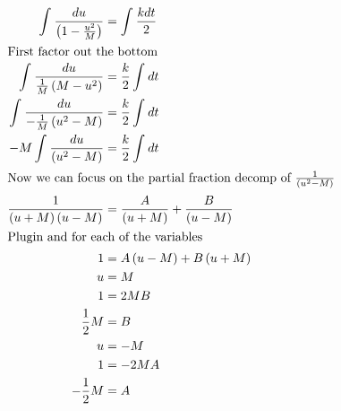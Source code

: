 \documentclass[12pt]{article}
\begin{document}
\begin{align}
  \int_{ }^{ }\frac{du}{\left(1-\frac{u^{2}}{M}\right)}                            & =\int_{ }^{ }\frac{kdt}{2}                                                         \\
  \intertext{First factor out the bottom}
  \int_{ }^{ }\frac{du}{\frac{1}{M}\left(M-u^{2}\right)}                           & =\frac{k}{2}\int_{ }^{ }dt                                                         \\
  \int_{ }^{ }\frac{du}{-\frac{1}{M}\left(u^{2}-M\right)}                          & =\frac{k}{2}\int_{ }^{ }dt                                                         \\
  -M\int_{ }^{ }\frac{du}{\left(u^{2}-M\right)}                                    & =\frac{k}{2}\int_{ }^{ }dt                                                         \\
  \intertext{Now we can focus on the partial fraction decomp of $\frac{1}{\left(u^{2}-M\right)}$}
  \frac{1}{\left(u+M\right)\left(u-M\right)}                                       & =\frac{A}{\left(u+M\right)}+\frac{B}{\left(u-M\right)}                             \\
  \intertext{Plugin and for each of the variables}
  1                                                                                & =A\left(u-M\right)+B\left(u+M\right)                                               \\
  u                                                                                & =M                                                                                 \\
  1                                                                                & =2MB                                                                               \\
  \frac{1}{2}M                                                                     & =B                                                                                 \\
  u                                                                                & =-M                                                                                \\
  1                                                                                & =-2MA                                                                              \\
  -\frac{1}{2}M                                                                    & =A                                                                                 \\

\end{align}
\end{document}
